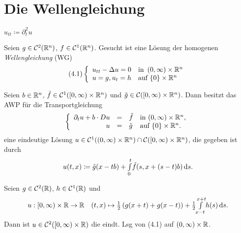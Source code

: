 \documentclass{cheat-sheet}
\begin{document}

\section{Die Wellengleichung}




\begin{nota}
  $u_{tt} \coloneqq \partial_t^2 u$
\end{nota}

\begin{prob}
  Seien $g \in \mathcal{C}^2(\mathbb{R}^n)$, $f \in \mathcal{C}^1(\mathbb{R}^n)$. Gesucht ist eine Lösung der homogenen \emph{Wellengleichung} (WG)
  \[
    (4.1) \left\{ \begin{array}{ll}
      u_{tt} - \Delta u = 0 & \text{in } \left( 0, \infty \right) \times \mathbb{R}^n\\
      u = g, u_t = h & \text{auf } \{ 0 \} \times \mathbb{R}^n
    \end{array} \right.
  \]
\end{prob}

\begin{satz}
  Seien $b \in \mathbb{R}^n$, $\tilde{f} \in \mathcal{C}^1(\left[ 0, \infty \right) \times \mathbb{R}^n)$ und $\tilde{g} \in \mathcal{C}(\left[ 0, \infty \right) \times \mathbb{R}^n)$. Dann besitzt das AWP für die Transportgleichung
  \[
    \left\{ \begin{array}{rlll}
      \partial_t u + b \cdot Du &=& \tilde{f} & \text{in $\left( 0, \infty \right) \times \mathbb{R}^n$},\\
      u &=& \tilde{g} & \text{auf $\{ 0 \} \times \mathbb{R}^n$}.
    \end{array} \right.
  \]
  eine eindeutige Lösung $u \in \mathcal{C}^1(\left( 0, \infty \right) \times \mathbb{R}^n) \cap \mathcal{C}(\left[ 0, \infty \right) \times \mathbb{R}^n)$, die gegeben ist durch
  \[ u(t, x) \coloneqq \tilde{g}(x - tb) + {\textstyle \int\limits_{0}^{t}} \tilde{f}(s, x + (s - t) b) \,\mathrm{d} s. \]
\end{satz}

\begin{satz}
  Seien $g \in \mathcal{C}^2(\mathbb{R})$, $h \in \mathcal{C}^1(\mathbb{R})$ und
  \[
    u : \left[ 0, \infty \right) \times \mathbb{R} \to \mathbb{R} \quad
    (t, x) \mapsto \tfrac{1}{2} \left( g(x+t) + g(x-t) \right) + \tfrac{1}{2} {\textstyle \int\limits_{x-t}^{x+t}} h(s) \,\mathrm{d} s.
  \]
  Dann ist $u \in \mathcal{C}^2(\left[ 0, \infty \right) \times \mathbb{R})$ die eindt. Lsg von (4.1) auf $\left( 0, \infty \right) \times \mathbb{R}$.
\end{satz}
\end{document}
